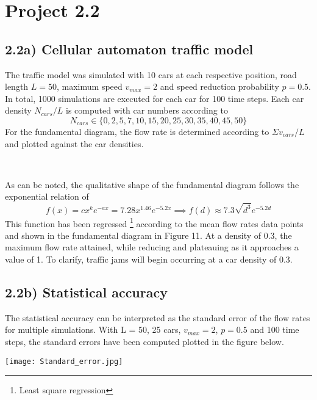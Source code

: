 \documentclass[12pt]{article}
\begin{document}
\newpage
\section*{Project 2.2}
\subsection*{2.2a) Cellular automaton traffic model}
The traffic model was simulated with 10 cars at each respective position, road length $L = 50$, maximum speed $v_{max} = 2$ and speed reduction probability $p = 0.5$. In total, 1000 simulations are executed for each car for 100 time steps. 
Each car density $N_{cars}/L$ is computed with car numbers according to
\begin{equation*}
N_{cars} \in \{ 0, 2, 5, 7, 10, 15, 20, 25, 30, 35, 40, 45, 50 \}
\end{equation*}
For the fundamental diagram, the flow rate is determined according to $\Sigma v_{cars}/L$ and plotted against the car densities.
\begin{figure*}[ht!]
\begin{center}
   \\
   \caption{\label{workflow} (a) Traffic simulation (b) Fundamental diagram}
\end{center}
\end{figure*}

\noindent As can be noted, the qualitative shape of the fundamental diagram follows the exponential relation of 
\begin{equation*}
f(x) = cx^k e^{-ax} = 7.28x^{1.46} e^{-5.2x}
\implies f(d) \approx 7.3\sqrt{d^3} e^{-5.2d}
\end{equation*}
This function has been regressed \footnote{Least square regression} according to the mean flow rates data points and shown in the fundamental diagram in Figure 11. At a density of 0.3, the maximum flow rate attained, while reducing and plateauing as it approaches a value of 1. To clarify, traffic jams will begin occurring at a car density of 0.3.

\newpage
\subsection*{2.2b) Statistical accuracy}
The statistical accuracy can be interpreted as the standard error of the flow rates for multiple simulations. With L = 50, 25 cars, $v_{max} = 2$, $p = 0.5$ and 100 time steps, the standard errors have been computed plotted in the figure below.
\begin{figure*}[ht!]
\begin{center}
    \texttt{[image: Standard\_error.jpg]}
 \caption{}
\end{center}
\end{figure*}
\end{document}
